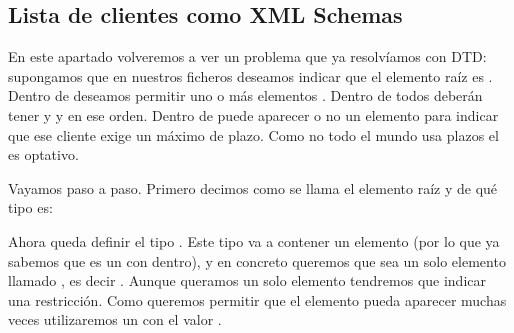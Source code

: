 \documentclass[letterpaper,10pt,spanish]{sphinxmanual}
\begin{document}
\subsection{Lista de clientes como XML Schemas}
\label{\detokenize{tema5:lista-de-clientes-como-xml-schemas}}
En este apartado volveremos a ver un problema que ya resolvíamos con DTD: supongamos que en nuestros ficheros deseamos indicar que el elemento raíz es . Dentro de  deseamos permitir uno o más elementos . Dentro de  todos deberán tener  y  y en ese orden. Dentro de  puede aparecer o no un elemento  para indicar que ese cliente exige un máximo de plazo. Como no todo el mundo usa plazos el  es optativo.

Vayamos paso a paso. Primero decimos como se llama el elemento raíz y de qué tipo es:

\begin{sphinxVerbatim}[commandchars=\\\{\}]
 
      
\end{sphinxVerbatim}

Ahora queda definir el tipo . Este tipo va a contener un elemento (por lo que ya sabemos que es un  con  dentro), y en concreto queremos que sea un solo elemento llamado , es decir . Aunque queramos un solo elemento tendremos que indicar una restricción. Como queremos permitir que el elemento pueda aparecer muchas veces utilizaremos un  con el valor .
\end{document}
